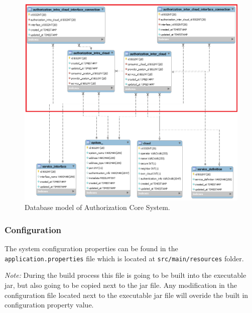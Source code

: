 \documentclass[a4paper]{arrowhead}
\begin{document}
\begin{figure}[h!]
  \centering
  \includegraphics[width=\textwidth]{figures/authorization_database_model.png}
  \caption{
    Database model of Authorization Core System.
  }
  \label{fig:model_overview}
\end{figure}

\clearpage

\subsubsection{Configuration}
The system configuration properties can be found in the \texttt{application.properties} file which is located at \texttt{src/main/resources} folder.

\textit{Note:} During the build process this file is going to be built into the executable jar, but also going to be copied next to the jar file. Any modification in the configuration file located next to the executable jar file will overide the built in configuration property value.
\end{document}
